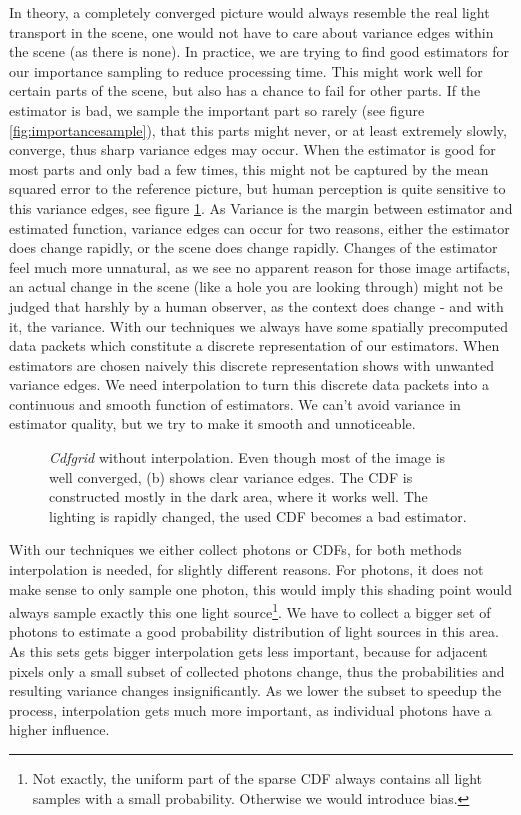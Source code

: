 In theory, a completely converged picture would always resemble the real light transport in the scene, one would not have to care about variance edges within the scene (as there is none). In practice, we are trying to find good estimators for our importance sampling to reduce processing time. This might work well for certain parts of the scene, but also has a chance to fail for other parts. If the estimator is bad, we sample the important part so rarely (see figure \ref{fig:importancesample}), that this parts might never, or at least extremely slowly, converge, thus sharp variance edges may occur. When the estimator is good for most parts and only bad a few times, this might not be captured by the mean squared error to the reference picture, but human perception is quite sensitive to this variance edges, see figure \ref{fig:varianceEdgeCdfgrid}. As Variance is the margin between estimator and estimated function, variance edges can occur for two reasons, either the estimator does change rapidly, or the scene does change rapidly. Changes of the estimator feel much more unnatural, as we see no apparent reason for those image artifacts, an actual change in the scene (like a hole you are looking through) might not be judged that harshly by a human observer, as the context does change - and with it, the variance. With our techniques we always have some spatially precomputed data packets which constitute a discrete representation of our estimators. When estimators are chosen naively this discrete representation shows with unwanted variance edges. We need interpolation to turn this discrete data packets into a continuous and smooth function of estimators. We can't avoid variance in estimator quality, but we try to make it smooth and unnoticeable.

\begin{figure}[htb] 
	\centering
    
    \caption{\textit{Cdfgrid} without interpolation. Even though most of the image is well converged, (b) shows clear variance edges. The CDF is constructed mostly in the dark area, where it works well. The lighting is rapidly changed, the used CDF becomes a bad estimator. } 
    \label{fig:varianceEdgeCdfgrid}
\end{figure}

With our techniques we either collect photons or CDFs, for both methods interpolation is needed, for slightly different reasons. For photons, it does not make sense to only sample one photon, this would imply this shading point would always sample exactly this one light source\footnote{Not exactly, the uniform part of the sparse CDF always contains all light samples with a small probability. Otherwise we would introduce bias.}. We have to collect a bigger set of photons to estimate a good probability distribution of light sources in this area. As this sets gets bigger interpolation gets less important, because for adjacent pixels only a small subset of collected photons change, thus the probabilities and resulting variance changes insignificantly. As we lower the subset to speedup the process, interpolation gets much more important, as individual photons have a higher influence.

